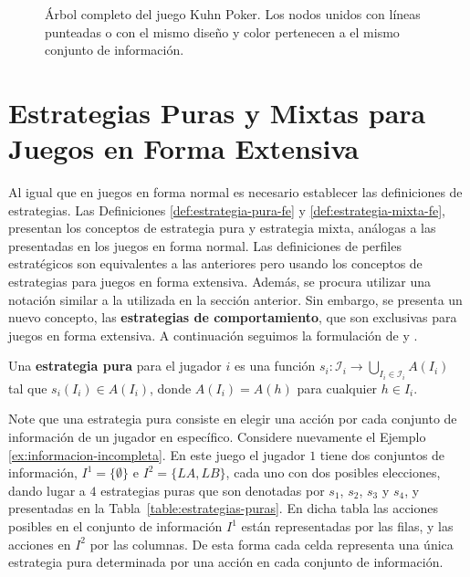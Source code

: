 \begin{figure}[h]
\begin{center}
\end{center}
\caption[Árbol completo del juego Kuhn Poker]{Árbol completo del juego Kuhn Poker. Los nodos unidos con líneas punteadas o con el mismo diseño y color pertenecen a el mismo conjunto de información.}
\label{fig:kuhn-poker}
\end{figure}

\section{Estrategias Puras y Mixtas para Juegos en Forma Extensiva}

Al igual que en juegos en forma normal es necesario establecer las definiciones de estrategias. Las Definiciones \ref{def:estrategia-pura-fe} y \ref{def:estrategia-mixta-fe}, presentan los conceptos de estrategia pura y estrategia mixta, análogas a las presentadas en los juegos en forma normal. Las definiciones de perfiles estratégicos son equivalentes a las anteriores pero usando los conceptos de estrategias para juegos en forma extensiva. Además, se procura utilizar una notación similar a la utilizada en la sección anterior. Sin embargo, se presenta un nuevo concepto, las \textbf{estrategias de comportamiento}, que son exclusivas para juegos en forma extensiva. A continuación seguimos la formulación de \cite{bib:conceptos-basicos} y \cite{bib:course-game-theory}.

\begin{definition}
\label{def:estrategia-pura-fe}
Una \textbf{estrategia pura} para el jugador $i$ es una función $s_i : \mathcal{I}_i \rightarrow \bigcup_{I_i \in \mathcal{I}_i}A(I_i)$ tal que $s_i(I_i) \in A(I_i)$, donde $A(I_i) = A(h)$ para cualquier $h \in I_i$. 
\end{definition}

Note que una estrategia pura consiste en elegir una acción por cada conjunto de información de un jugador en específico. Considere nuevamente el Ejemplo \ref{ex:informacion-incompleta}. En este juego el jugador $1$ tiene dos conjuntos de información, $I^1 = \{\emptyset\}$ e $I^2 = \{LA, LB\}$, cada uno con dos posibles elecciones, dando lugar a $4$ estrategias puras que son denotadas por $s_1$, $s_2$, $s_3$ y $s_4$, y presentadas en la Tabla~\ref{table:estrategias-puras}. En dicha tabla las acciones posibles en el conjunto de información $I^1$ están representadas por las filas, y las acciones en $I^2$ por las columnas. De esta forma cada celda representa una única estrategia pura determinada por una acción en cada conjunto de información.

